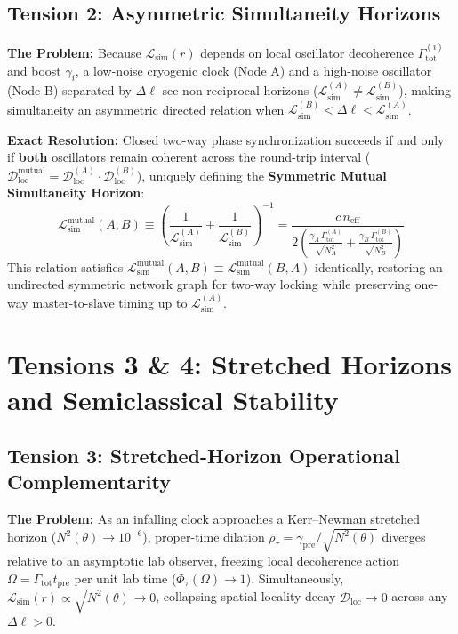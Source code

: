 \documentclass[11pt,a4paper]{article}
\begin{document}
\subsection{Tension 2: Asymmetric Simultaneity Horizons}
\textbf{The Problem:} Because $\mathcal{L}_{\mathrm{sim}}(r)$ depends on local oscillator decoherence $\Gamma_{\mathrm{tot}}^{(i)}$ and boost $\gamma_i$, a low-noise cryogenic clock (Node A) and a high-noise oscillator (Node B) separated by $\Delta\ell$ see non-reciprocal horizons ($\mathcal{L}_{\mathrm{sim}}^{(A)} \neq \mathcal{L}_{\mathrm{sim}}^{(B)}$), making simultaneity an asymmetric directed relation when $\mathcal{L}_{\mathrm{sim}}^{(B)} < \Delta\ell < \mathcal{L}_{\mathrm{sim}}^{(A)}$.

\textbf{Exact Resolution:} Closed two-way phase synchronization succeeds if and only if \textbf{both} oscillators remain coherent across the round-trip interval ($\mathcal{D}_{\mathrm{loc}}^{\mathrm{mutual}} = \mathcal{D}_{\mathrm{loc}}^{(A)} \cdot \mathcal{D}_{\mathrm{loc}}^{(B)}$), uniquely defining the \textbf{Symmetric Mutual Simultaneity Horizon}:
\begin{equation}
    \mathcal{L}_{\mathrm{sim}}^{\mathrm{mutual}}(A,B) \equiv \left(\frac{1}{\mathcal{L}_{\mathrm{sim}}^{(A)}} + \frac{1}{\mathcal{L}_{\mathrm{sim}}^{(B)}}\right)^{-1} = \frac{c \, n_{\mathrm{eff}}}{2 \left(\frac{\gamma_A \, \Gamma_{\mathrm{tot}}^{(A)}}{\sqrt{N_A^2}} + \frac{\gamma_B \, \Gamma_{\mathrm{tot}}^{(B)}}{\sqrt{N_B^2}}\right)}
\end{equation}
This relation satisfies $\mathcal{L}_{\mathrm{sim}}^{\mathrm{mutual}}(A,B) \equiv \mathcal{L}_{\mathrm{sim}}^{\mathrm{mutual}}(B,A)$ identically, restoring an undirected symmetric network graph for two-way locking while preserving one-way master-to-slave timing up to $\mathcal{L}_{\mathrm{sim}}^{(A)}$.
\section{Tensions 3 \& 4: Stretched Horizons and Semiclassical Stability}

\subsection{Tension 3: Stretched-Horizon Operational Complementarity}
\textbf{The Problem:} As an infalling clock approaches a Kerr--Newman stretched horizon ($N^2(\theta) \to 10^{-6}$), proper-time dilation $\rho_\tau = \gamma_{\mathrm{pre}} / \sqrt{N^2(\theta)}$ diverges relative to an asymptotic lab observer, freezing local decoherence action $\Omega = \Gamma_{\mathrm{tot}} t_{\mathrm{pre}}$ per unit lab time ($\Phi_\tau(\Omega) \to 1$). Simultaneously, $\mathcal{L}_{\mathrm{sim}}(r) \propto \sqrt{N^2(\theta)} \to 0$, collapsing spatial locality decay $\mathcal{D}_{\mathrm{loc}} \to 0$ across any $\Delta\ell > 0$.
\end{document}
